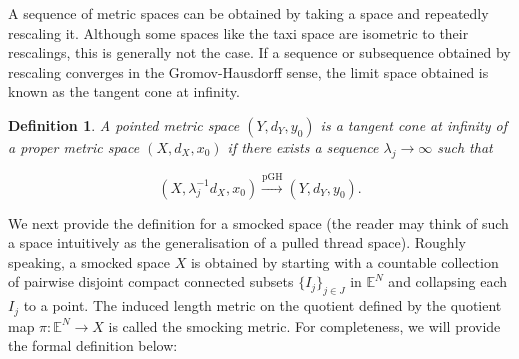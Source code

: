 \documentclass[12pt, letterpaper]{article}
\newtheorem{definition}{Definition}
\begin{document}
\noindent
A sequence of metric spaces can be obtained by taking a space and repeatedly rescaling it.
Although some spaces like the taxi space are isometric to their rescalings, this
is generally not the case. If a sequence or subsequence obtained by rescaling
converges in the Gromov-Hausdorff sense, the limit space obtained is known
as the tangent cone at infinity.

\begin{definition} A pointed metric space $(Y,d_Y,y_0)$ is a tangent cone at infinity
of a proper metric space $(X,d_X, x_0)$ if there exists a sequence
$\lambda_j\to\infty$ such that

\[
(X,\lambda_j^{-1}d_X,x_0)
\xrightarrow{\mathrm{pGH}}
(Y,d_Y,y_0).
\]
\end{definition}

We next provide the definition for a smocked space (the reader may think of such a space intuitively as the generalisation of a pulled thread space).  Roughly speaking, a smocked space $X$ is obtained by starting with a countable collection of pairwise disjoint compact connected subsets $\{I_j\}_{j\in J}$ in $\mathbb E^N$ and collapsing each $I_j$ to a point.  The induced length metric on the quotient defined by the quotient map $\pi:\mathbb E^N\to X$ is called the smocking metric.  For completeness, we will provide the formal definition below:
\end{document}
